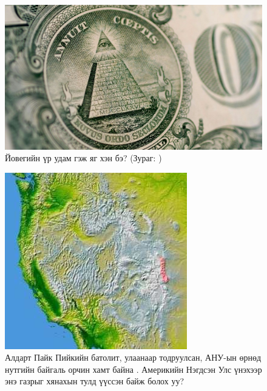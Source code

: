 \documentclass[10pt,twocolumn,letterpaper]{article}
\begin{document}
\begin{figure}[t]
\begin{center}
   \includegraphics[width=1\linewidth]{illuminati.jpg}
\end{center}
   \caption{Йовегийн үр удам гэж яг хэн бэ? (Зураг: \cite{35})}
\label{fig:10}
\label{fig:onecol}
\end{figure}

\begin{figure}[t]
\begin{center}
   \includegraphics[width=1\linewidth]{pike.jpg}
\end{center}
   \caption{Алдарт Пайк Пийкийн батолит, улаанаар тодруулсан, АНУ-ын өрнөд нутгийн байгаль орчин хамт байна \cite{36}. Америкийн Нэгдсэн Улс үнэхээр энэ газрыг хянахын тулд үүссэн байж болох уу?}
\label{fig:11}
\label{fig:onecol}
\end{figure}
\end{document}
